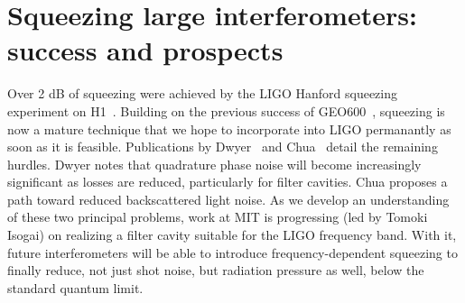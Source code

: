 \section{Squeezing large interferometers: success and prospects}
\label{squeezing_success}


	    Over 2 dB of squeezing were achieved by the LIGO Hanford squeezing experiment on H1~\cite{BarsottiNatureSqueezing}. Building on the previous success of GEO600~\cite{GEO600NatureSqueezing}, squeezing is now a mature technique that we hope to incorporate into LIGO permanantly as soon as it is feasible.
Publications by Dwyer~\cite{DwyerPhaseNoise} and Chua~\cite{ChuaBackscatteredLight} detail the remaining hurdles.
Dwyer notes that quadrature phase noise will become increasingly significant as losses are reduced, particularly for filter cavities.
Chua proposes a path toward reduced backscattered light noise.
As we develop an understanding of these two principal problems, work at MIT is progressing (led by Tomoki Isogai) on realizing a filter cavity suitable for the LIGO frequency band.
With it, future interferometers will be able to introduce frequency-dependent squeezing to finally reduce, not just shot noise, but radiation pressure as well, below the standard quantum limit.


